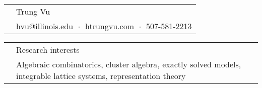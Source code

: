 \documentclass[letterpaper, 11pt]{article}
\newcommand{\headingfont}{\Large\color{Red}}
\newenvironment{SectionTable}[1]{
	\renewcommand*{\arraystretch}{1.7}
	\setlength{\tabcolsep}{10pt}
	\begin{longtable}{Rp{5.2in}} & #1 \\}
	{\end{longtable}\vspace{-.3cm}}
\begin{document}
	
	
	\begin{SectionTable}{\Huge Trung Vu} & 
		hvu@illinois.edu   $\;\boldsymbol{\cdot}\;$ 
		htrungvu.com 
		$\;\boldsymbol{\cdot}\;$ 
		507-581-2213 \newline
	\end{SectionTable}
	
	
	\begin{SectionTable}{\headingfont Research interests}
		& Algebraic combinatorics, cluster algebra, exactly solved models, integrable lattice systems, representation theory 
	\end{SectionTable}
	
		
		
	
	
\end{document}
